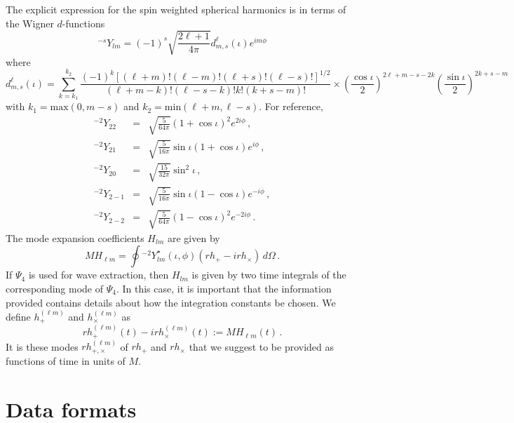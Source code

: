 \documentclass[prd,preprintnumbers,superscriptaddress,eqsecnum]{revtex4}
\numberwithin{equation}{section}
\newcommand{\Ys}{{{}^{-s}Y}}
\newcommand{\Ytwo}{{{}^{-2}Y}}
\begin{document}
The explicit expression for the spin weighted spherical harmonics is
in terms of the Wigner $d$-functions
\begin{equation}
  \label{eq:5}
   \Ys_{lm} = (-1)^s\sqrt{\frac{2\ell+1}{4\pi}} d^\ell_{m,s}(\iota)e^{im\phi}
\end{equation}
where
\begin{equation}
  \label{eq:6}
  d^\ell_{m,s}(\iota) = \sum_{k = k_1}^{k_2}
    \frac{(-1)^k[(\ell+m)!(\ell-m)!(\ell+s)!(\ell-s)!]^{1/2}}{(\ell +m
      -k)!(\ell-s-k)!k!(k+s-m)!}  
    \times \left(\frac{\cos\iota}{2}\right)^{2\ell+m-s-2k}\left(\frac{\sin\iota}{2}\right)^{2k+s-m}  
\end{equation}
with $k_1 = \textrm{max}(0, m-s)$ and $k_2=\textrm{min}(\ell+m,
\ell-s)$.  For reference,
\begin{eqnarray}
  \label{eq:7}
  \Ytwo_{22} &=& \sqrt{\frac{5}{64\pi}}(1+\cos\iota)^2e^{2i\phi} \,,\\
  \Ytwo_{21} &=& \sqrt{\frac{5}{16\pi}}  \sin\iota( 1 + \cos\iota )e^{i\phi} \,,\\
  \Ytwo_{20} &=& \sqrt{\frac{15}{32\pi}} \sin^2\iota \,,\\
  \Ytwo_{2-1} &=& \sqrt{\frac{5}{16\pi}}  \sin\iota( 1 - \cos\iota
  )e^{-i\phi} \,,\\
  \Ytwo_{2-2} &=& \sqrt{\frac{5}{64\pi}}(1-\cos\iota)^2e^{-2i\phi}\,.
\end{eqnarray}
The mode expansion coefficients $H_{lm}$ are given by
\begin{equation}
  \label{eq:10}
  MH_{\ell m} = \oint \Ytwo_{lm}^\star(\iota,\phi)(rh_+-irh_\times )\,d\Omega\,.
\end{equation}
If $\Psi_4$ is used for wave extraction, then $H_{lm}$ is given by two
time integrals of the corresponding mode of $\Psi_4$.  In this case, it
is important that the information provided contains details about how
the integration constants be chosen.  We define $h_+^{(\ell m)}$ and
$h_\times^{(\ell m)}$ as
\begin{equation}
  \label{eq:11}
  rh_+^{(\ell m)}(t) -irh_\times^{(\ell m)}(t) := MH_{\ell m}(t)\,.  
\end{equation}
It is these modes $rh_{+,\times}^{(\ell m)}$ of $rh_+$ and $rh_\times$
that we suggest to be provided as functions of time in units of $M$.




\section{Data formats}
\label{sec:format}
\end{document}
